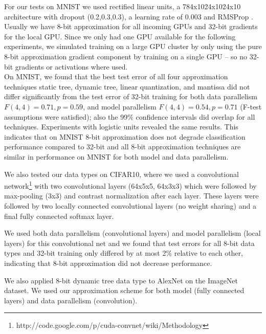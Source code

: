 \documentclass{article} %
\begin{document}
For our tests on MNIST we used rectified linear units, a 784x1024x1024x10 architecture with dropout (0.2,0.3,0.3), a learning rate of 0.003 and RMSProp  \citep{tieleman2012lecture}. Usually we have 8-bit approximation for all incoming GPUs and 32-bit gradients for the local GPU. Since we only had one GPU available for the following experiments, we simulated training on a large GPU cluster by only using the pure 8-bit approximation gradient component by training on a single GPU -- so no 32-bit gradients or activations where used. \\
On MNIST, we found that the best test error of all four approximation techniques static tree, dynamic tree, linear quantization, and mantissa  did not differ significantly from the test error of 32-bit training for both data parallelism $F(4,4) = 0.71, p = 0.59$, and model parallelism $F(4,4) = 0.54, p = 0.71$ (F-test assumptions were satisfied); also the 99\% confidence intervals did overlap for all techniques. Experiments with logistic units revealed the same results. This indicates that on MNIST 8-bit approximation does not degrade classification performance compared to 32-bit and all 8-bit approximation techniques are similar in performance on MNIST for both model and data parallelism.


We also tested our data types on CIFAR10, where we used a convolutional network\footnote{http://code.google.com/p/cuda-convnet/wiki/Methodology} with two convolutional layers (64x5x5, 64x3x3) which were followed by max-pooling (3x3) and contrast normalization after each layer. These layers were followed by two locally connected convolutional layers (no weight sharing) and a final fully connected softmax layer.

We used both data parallelism (convolutional layers) and model parallelism (local layers) for this convolutional net and we found that test errors for all 8-bit data types and 32-bit training only differed by at most 2\% relative to each other, indicating that 8-bit approximation did not decrease performance.

We also applied 8-bit dynamic tree data type to AlexNet on the ImageNet dataset. We used our approximation scheme for both model (fully connected layers) and data parallelism (convolution). 
\end{document}
